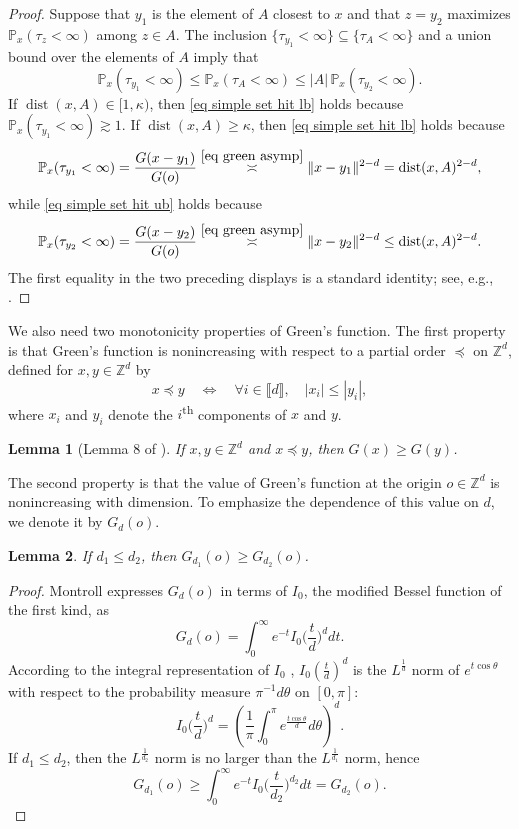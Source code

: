 \documentclass[11pt,reqno]{amsart}
\newtheorem{lemma}{Lemma}[section]
\theoremstyle{definition}
\numberwithin{equation}{section}
\newcommand{\Z}{\mathbb{Z}}
\renewcommand{\P}{\mathbb{P}}
\newcommand{\1}{\mathbf{1}}
\DeclareMathOperator{\dist}{dist}
\newcommand{\llb}{\llbracket}
\newcommand{\rrb}{\rrbracket}
\begin{document}
\begin{proof}
Suppose that $y_1$ is the element of $A$ closest to $x$ and that $z = y_2$ maximizes $\P_x (\tau_z < \infty)$ among $z \in A$. The inclusion $\{\tau_{y_1} < \infty\} \subseteq \{\tau_A < \infty\}$ and a union bound over the elements of $A$ imply that
\[
\P_x (\tau_{y_1} < \infty) \leq \P_x (\tau_A < \infty) \leq |A| \, \P_x (\tau_{y_2} < \infty).
\]
If $\dist (x,A) \in [1,\kappa)$, then \eqref{eq simple set hit lb} holds because $\P_x (\tau_{y_1} < \infty) \gtrsim 1$. If $\dist (x,A) \geq \kappa$, then \eqref{eq simple set hit lb} holds because
\[
\P_x (\tau_{y_1} < \infty) = \frac{G(x-y_1)}{G(o)} \stackrel{\eqref{eq green asymp}}{\asymp} \|x-{y_1}\|^{2-d} = \dist(x,A)^{2-d},
\]
while \eqref{eq simple set hit ub} holds because
\[
\P_x (\tau_{y_2} < \infty) = \frac{G(x-y_2)}{G(o)} \stackrel{\eqref{eq green asymp}}{\asymp} \|x-y_2\|^{2-d} \leq \dist(x,A)^{2-d}.
\]
The first equality in the two preceding displays is a standard identity; see, e.g., \cite[Equation 3.4]{popov2021}.
\end{proof}


We also need two monotonicity properties of Green's function. The first property is that Green's function is nonincreasing with respect to a partial order $\preceq$ on $\Z^d$, defined for $x, y \in \Z^d$ by 
\[
x \preceq y \quad \iff \quad \forall i \in \llb d \rrb, \quad |x_i| \leq |y_i|,
\]
where $x_i$ and $y_i$ denote the $i$\textsuperscript{th} components of $x$ and $y$.

\begin{lemma}[Lemma 8 of \cite{chiarini2016note}]\label{gpart}
If $x, y \in \Z^d$ and $x \preceq y$, then $G(x) \geq G(y)$. 
\end{lemma}

The second property is that the value of Green's function at the origin $o \in \Z^d$ is nonincreasing with dimension. To emphasize the dependence of this value on $d$, we denote it by $G_d (o)$.
\begin{lemma}\label{g dec}
If $d_1 \leq d_2$, then $G_{d_1} (o) \geq G_{d_2} (o)$.
\end{lemma}

\begin{proof}
Montroll \cite[Eq. (2.10)]{montroll1956} expresses $G_d (o)$ in terms of $I_0$, the modified Bessel function of the first kind, as
\[ G_d(o) = \int_0^\infty e^{-t} I_0 \Big( \frac{t}{d} \Big)^d d t.\]
According to the integral representation of $I_0$ \cite[Eq. 9.6.19]{abramowitz1964}, $I_0 (\frac{t}{d})^d$ is the $L^{\frac{1}{d}}$ norm of $e^{t \cos \theta}$ with respect to the probability measure $\pi^{-1} d \theta$ on $[0,\pi]$:
\[ I_0 \Big(\frac{t}{d}\Big)^d = \left(\frac{1}{\pi} \int_0^\pi e^{\tfrac{t \cos \theta}{d}} d \theta \right)^d.\]
If $d_1 \leq d_2$, then the $L^{\frac{1}{d_2}}$ norm is no larger than the $L^{\frac{1}{d_1}}$ norm, hence
\[ G_{d_1} (o) \geq \int_0^\infty e^{-t} I_0 \Big(\frac{t}{d_2}\Big)^{d_2} d t = G_{d_2} (o).\]
\end{proof}
\end{document}
